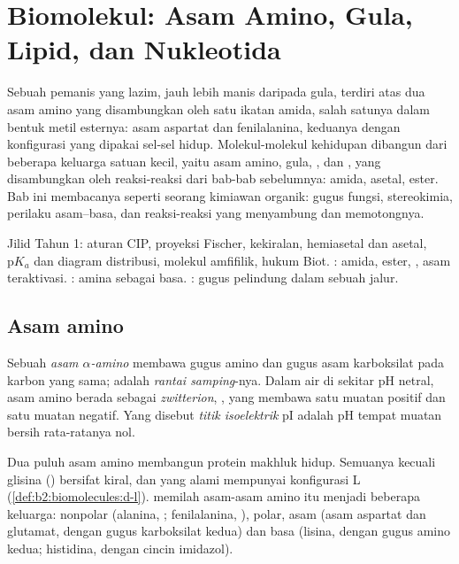 \chapter{Biomolekul: Asam Amino, Gula, Lipid, dan Nukleotida}\label{ch:b2:biomolecules}

Sebuah pemanis yang lazim, jauh lebih manis daripada gula, terdiri atas dua
asam amino yang disambungkan oleh satu ikatan amida, salah satunya dalam
bentuk metil esternya: asam aspartat dan fenilalanina, keduanya dengan
konfigurasi yang dipakai sel-sel hidup. Molekul-molekul kehidupan dibangun
dari beberapa keluarga satuan kecil, yaitu asam amino, gula, , dan
, yang disambungkan oleh reaksi-reaksi dari bab-bab sebelumnya:
amida, asetal, ester. Bab ini membacanya seperti seorang kimiawan organik:
gugus fungsi, stereokimia, perilaku asam--basa, dan reaksi-reaksi yang
menyambung dan memotongnya.

\begin{recall}
Jilid Tahun 1: aturan CIP, proyeksi Fischer, kekiralan, hemiasetal dan
asetal, $\mathrm pK_a$
dan diagram distribusi, molekul amfifilik, hukum Biot. :
amida, ester, , asam teraktivasi. : amina
sebagai basa. : gugus pelindung dalam sebuah
jalur.
\end{recall}

\section{Asam amino}

\begin{definition}\label{def:b2:biomolecules:amino-acid}
Sebuah \emph{asam $\alpha$-amino}
 membawa gugus amino dan gugus asam karboksilat pada karbon
yang sama;  adalah \emph{rantai
samping}-nya. Dalam air di sekitar pH netral, asam
amino berada sebagai \emph{zwitterion},
, yang membawa satu muatan positif dan satu muatan
negatif. Yang disebut \emph{titik
isoelektrik} pI adalah pH tempat muatan bersih
rata-ratanya nol.
\end{definition}

Dua puluh asam amino membangun protein makhluk hidup. Semuanya kecuali
glisina () bersifat kiral, dan yang alami mempunyai konfigurasi L
(\cref{def:b2:biomolecules:d-l}).  memilah asam-asam amino
itu menjadi beberapa keluarga: nonpolar (alanina, ; fenilalanina,
), polar, asam (asam aspartat dan glutamat, dengan gugus
karboksilat kedua) dan basa (lisina, dengan gugus amino kedua; histidina,
dengan cincin imidazol).

